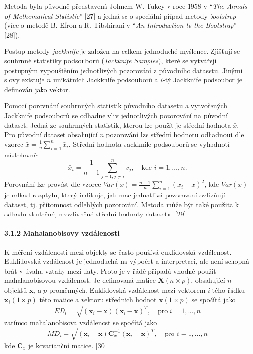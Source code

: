 \documentclass[12pt,]{article}
\let\oldparagraph\paragraph
\renewcommand{\paragraph}[1]{\oldparagraph{#1}\mbox{}}
\begin{document}
\qquad Metoda byla původně představená Johnem W. Tukey v roce 1958 v
\enquote{\emph{The Annals of Mathematical Statistic}} {[}27{]} a jedná
se o speciální případ metody \emph{bootstrap} (více o metodě B. Efron a
R. Tibshirani v \enquote{\emph{An Introduction to the Bootstrap}}
{[}28{]}).

\qquad Postup metody \emph{jackknife} je založen na celkem jednoduché
myšlence. Zjišťují se souhrnné statistiky podsouborů (\emph{Jackknife
Samples}), které se vytvářejí postupným vypouštěním jednotlivých
pozorování z původního datasetu. Jinými slovy existuje \(n\) unikátních
Jackknife podsouborů a \(i\)-tý Jackknife podsoubor je definován jako
vektor.

\qquad Pomocí porovnání souhrnných statistik původního datasetu a
vytvořených Jackknife podsouborů se odhadne vliv jednotlivých pozorování
na původní dataset. Jedná ze souhrnných statistik, kterou lze použít je
střední hodnota \(\bar{x}\). Pro původní dataset obsahující \(n\)
pozorování lze střední hodnotu odhadnout dle vzorce
\(\bar{x} = \frac{1}{n} \sum \limits_{i=1}^{n} \bar{x}_i\). Střední
hodnota Jackknife podsouborů se vyhodnotí následovně:
\[\bar{x}_i = \frac{1}{n-1} \sum \limits_{j=1, j \neq i}^{n} x_j, \quad \text{kde } i=1,\dots,n.\]
Porovnání lze provést dle vzorce
\(\textit{Var}(\bar{x}) = \frac{n-1}{n} \sum \limits_{i=1}^{n}(\bar{x}_i - \bar{x})^2\),
kde \(\textit{Var}(\bar{x})\) je odhad rozptylu, který indikuje, jak moc
jednotlivá pozorování ovlivňují dataset, tj. přítomnost odlehlých
pozorování. Metoda může být také použita k odhadu skutečné, neovlivněné
střední hodnoty datasetu. {[}29{]}

\hypertarget{mbdist}{\paragraph{3.1.2 Mahalanobisovy
vzdálenosti}\label{mbdist}}

\qquad K měření vzdálenosti mezi objekty se často používá euklidovská
vzdálenost. Euklidovská vzdálenost je jednoduchá na výpočet a
interpretaci, ale není schopná brát v úvahu vztahy mezi daty. Proto je v
řádě případů vhodné použít mahalanobisovou vzdálenost. Je definovaná
matice \(\bm{X}(n \times p)\), obsahující \(n\) objektů \(\bm{x}_i\) a
\(p\) proměnných. Euklidovská vzdálenost mezi vektorem \(i\)-tého řádku
\(\bm{x}_i (1 \times p)\) této matice a vektoru středních hodnot
\(\bar{\bm{x}} (1 \times p)\) se spočítá jako
\[ED_i = \sqrt{(\bm{x}_i - \bar{\bm{x}})(\bm{x}_i - \bar{\bm{x}})^T}, \quad \text{pro } i = 1,\dots,n\]
zatímco mahalanobisova vzdálenost se spočítá jako
\[MD_i = \sqrt{(\bm{x}_i - \bar{\bm{x}}) \bm{C}^{-1}_x (\bm{x}_i - \bar{\bm{x}})^T}, \quad \text{pro } i = 1,\dots,n\]
kde \(\bm{C}_x\) je kovarianční matice. {[}30{]}
\end{document}
